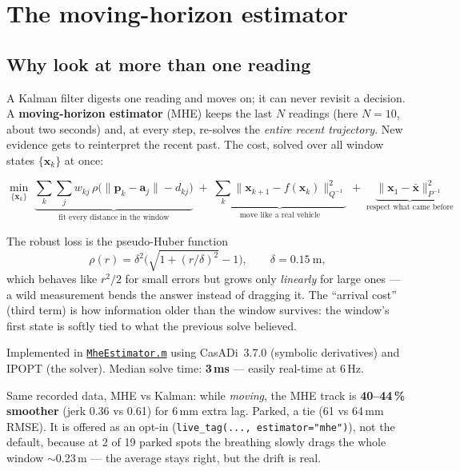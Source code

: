 \documentclass[11pt,a4paper]{article}
\newcommand{\gh}[2]{\href{https://github.com/AdershM-2/UWB_3/blob/main/#1}{\texttt{#2}}}
\newcommand{\code}[1]{\texttt{#1}}
\begin{document}
\section{The moving-horizon estimator}
\label{sec:mhe}

\subsection{Why look at more than one reading}

A Kalman filter digests one reading and moves on; it can never revisit a decision.
A \textbf{moving-horizon estimator} (MHE) keeps the last $N$ readings (here
$N{=}10$, about two seconds) and, at every step, re-solves the \emph{entire recent
trajectory}. New evidence gets to reinterpret the recent past. The cost, solved
over all window states $\{\mathbf{x}_k\}$ at once:

\begin{equation}
\label{eq:mhe}
\min_{\{\mathbf{x}_k\}}\;
\underbrace{\sum_{k}\sum_{j} w_{kj}\,
\rho\big(\lVert\mathbf{p}_k-\mathbf{a}_j\rVert - d_{kj}\big)}_{\text{fit every distance in the window}}
\;+\;
\underbrace{\sum_{k}\big\lVert \mathbf{x}_{k+1}-f(\mathbf{x}_k)\big\rVert^2_{Q^{-1}}}_{\text{move like a real vehicle}}
\;+\;
\underbrace{\big\lVert \mathbf{x}_1-\bar{\mathbf{x}}\big\rVert^2_{P^{-1}}}_{\text{respect what came before}}
\end{equation}

The robust loss is the pseudo-Huber function
\begin{equation}
\rho(r) = \delta^2\Big(\sqrt{1+(r/\delta)^2}-1\Big),
\qquad \delta = 0.15\ \text{m},
\end{equation}
which behaves like $r^2/2$ for small errors but grows only \emph{linearly} for
large ones --- a wild measurement bends the answer instead of dragging it.
The ``arrival cost'' (third term) is how information older than the window
survives: the window's first state is softly tied to what the previous solve
believed.

Implemented in \gh{matlab/+dune/MheEstimator.m}{MheEstimator.m} using
CasADi~3.7.0 (symbolic derivatives) and IPOPT (the solver). Median solve time:
\textbf{3\,ms} --- easily real-time at 6\,Hz.

\begin{result}
Same recorded data, MHE vs Kalman: while \emph{moving}, the MHE track is
\textbf{40--44\,\% smoother} (jerk 0.36 vs 0.61) for 6\,mm extra lag. Parked, a
tie (61 vs 64\,mm RMSE). It is offered as an opt-in
(\code{live\_tag(..., estimator="mhe")}), not the default, because at 2 of 19
parked spots the breathing slowly drags the whole window $\sim$0.23\,m --- the
average stays right, but the drift is real.
\end{result}
\end{document}
